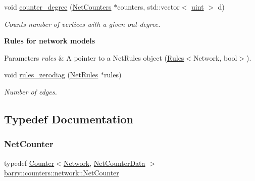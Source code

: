\begin{Indent}
\begin{DoxyCompactItemize}
void \hyperlink{namespacebarry_1_1counters_1_1network_a3d7953d9b68c547fc0d02cc1f6fadb23}{counter\+\_\+degree} (\hyperlink{namespacebarry_1_1counters_1_1network_aa72fdb34752ac24167a06ee196a8fff6}{Net\+Counters} $\ast$counters, std\+::vector$<$ \hyperlink{namespacebarry_a11dfc53ddb4672278319aa04f1e09a6c}{uint} $>$ d)
\begin{DoxyCompactList}\small\item\em Counts number of vertices with a given out-\/degree. \end{DoxyCompactList}\end{DoxyCompactItemize}
\end{Indent}
\begin{Indent}\textbf{ Rules for network models}\par
{\em 
\begin{DoxyParams}{Parameters}
{\em rules} & A pointer to a {\ttfamily Net\+Rules} object ({\ttfamily \hyperlink{classbarry_1_1_rules}{Rules}}$<${\ttfamily Network}, {\ttfamily bool}$>$). \\
\hline
\end{DoxyParams}
}\begin{DoxyCompactItemize}
\item 
void \hyperlink{namespacebarry_1_1counters_1_1network_a19680c70c20a093a84b6cc71a2597510}{rules\+\_\+zerodiag} (\hyperlink{namespacebarry_1_1counters_1_1network_adbdb20b3ce883777da2364984ea10c56}{Net\+Rules} $\ast$rules)
\begin{DoxyCompactList}\small\item\em Number of edges. \end{DoxyCompactList}\end{DoxyCompactItemize}
\end{Indent}


\subsection{Typedef Documentation}
\mbox{\label{namespacebarry_1_1counters_1_1network_a067bd9de04608fc2e1586324d3864a45}} 
\subsubsection{\texorpdfstring{Net\+Counter}{NetCounter}}
{\footnotesize\ttfamily typedef \hyperlink{classbarry_1_1_counter}{Counter}$<$\hyperlink{namespacebarry_1_1counters_1_1network_a440182967e1ba465e90a4b1d07e3a366}{Network}, \hyperlink{classbarry_1_1counters_1_1network_1_1_net_counter_data}{Net\+Counter\+Data} $>$ \hyperlink{namespacebarry_1_1counters_1_1network_a067bd9de04608fc2e1586324d3864a45}{barry\+::counters\+::network\+::\+Net\+Counter}}



